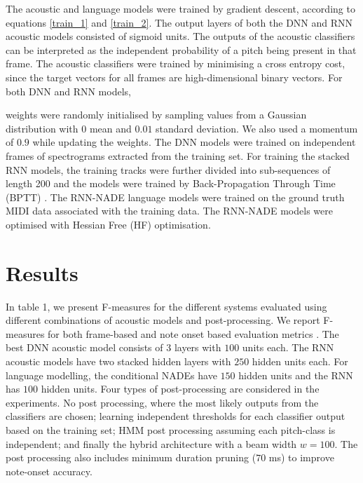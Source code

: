 \documentclass{article}
\begin{document}
The acoustic and language models were trained by gradient descent, according to equations \ref{train_1} and \ref{train_2}. The output layers of both the DNN and RNN acoustic models consisted of sigmoid units. The outputs of the acoustic classifiers can be interpreted as the independent probability of a pitch being present in that frame. 
The acoustic classifiers were trained by minimising a cross entropy cost, since the target vectors for all frames are high-dimensional binary vectors. For both DNN and RNN models, 
\begin{table}[htbp]
\caption{More results}
\end{table}
weights were randomly initialised by sampling values from a Gaussian distribution with $0$ mean and $0.01$ standard deviation. We also used a momentum of $0.9$ while updating the weights. The DNN models were trained on independent frames of spectrograms extracted from the training set. For training the stacked RNN models, the training tracks were further divided into sub-sequences of length 200 and the models were trained by Back-Propagation Through Time (BPTT) . The RNN-NADE language models were trained on the ground truth MIDI data associated with the training data. The RNN-NADE models were optimised with Hessian Free (HF) optimisation. 




\section{Results}
In table 1, we present F-measures for the different systems evaluated using different combinations of acoustic models and post-processing. We report F-measures for both frame-based and note onset based evaluation metrics \cite{bay2009evaluation}. The best DNN acoustic model consists of $3$ layers with $100$ units each. The RNN acoustic models have two stacked hidden layers with $250$ hidden units each. For language modelling, the conditional NADEs have $150$ hidden units and the RNN has $100$ hidden units. Four types of post-processing are considered in the experiments. No post processing, where the most likely outputs from the classifiers are chosen; learning independent thresholds for each classifier output based on the training set; HMM post processing assuming each pitch-class is independent; and finally the hybrid architecture with a beam width $w = 100$. The post processing also includes minimum duration pruning ($70$ ms) to improve note-onset accuracy. 
\end{document}
